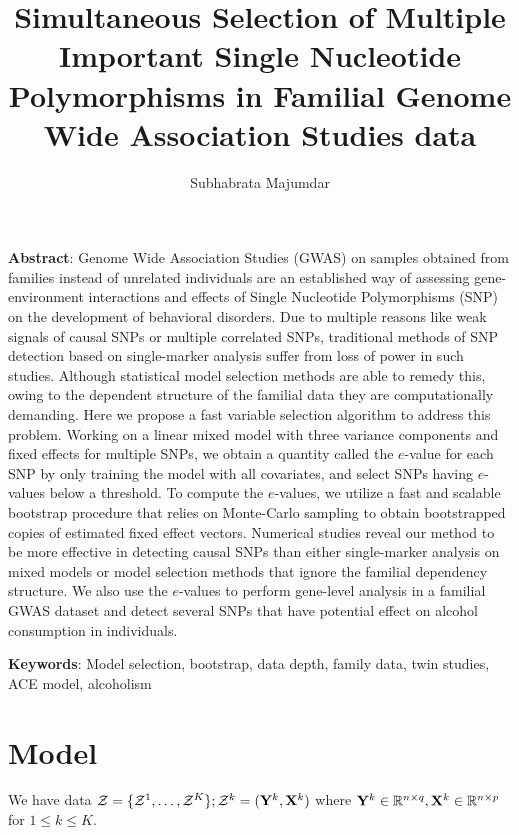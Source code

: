 \documentclass[fleqn,11pt]{article}
\numberwithin{equation}{section}
\begin{document}
\newtheorem{Theorem}{Theorem}[section]
\newtheorem{Lemma}[Theorem]{Lemma}
\newtheorem{Corollary}[Theorem]{Corollary}
\newtheorem{Proposition}[Theorem]{Proposition}
\newtheorem{Conjecture}[Theorem]{Conjecture}
\theoremstyle{definition} \newtheorem{Definition}[Theorem]{Definition}

\title{Simultaneous Selection of Multiple Important Single Nucleotide Polymorphisms in Familial Genome Wide Association Studies data}
\date{}
\author{Subhabrata Majumdar}
\maketitle

\noindent\textbf{Abstract}: Genome Wide Association Studies (GWAS) on samples obtained from families instead of unrelated individuals are an established way of assessing gene-environment interactions and effects of Single Nucleotide Polymorphisms (SNP) on the development of behavioral disorders. Due to multiple reasons like weak signals of causal SNPs or multiple correlated SNPs, traditional methods of SNP detection based on single-marker analysis suffer from loss of power in such studies. Although statistical model selection methods are able to remedy this, owing to the dependent structure of the familial data they are computationally demanding. Here we propose a fast variable selection algorithm to address this problem. Working on a linear mixed model with three variance components and fixed effects for multiple SNPs, we obtain a quantity called the $e$-value for each SNP by only training the model with all covariates, and select SNPs having $e$-values below a threshold. To compute the $e$-values, we utilize a fast and scalable bootstrap procedure that relies on Monte-Carlo sampling to obtain bootstrapped copies of estimated fixed effect vectors. Numerical studies reveal our method to be more effective in detecting causal SNPs than either single-marker analysis on mixed models or model selection methods that ignore the familial dependency structure. We also use the $e$-values to perform gene-level analysis in a familial GWAS dataset and detect several SNPs that have potential effect on alcohol consumption in individuals.
\vspace{.5cm}

\noindent\textbf{Keywords}: Model selection, bootstrap, data depth, family data, twin studies, ACE model, alcoholism

\newpage

\section{Model}
We have data ${\cal{Z}} = \{ {\cal{Z}}^1, \ldots, {\cal{Z}}^K \}; {\cal{Z}}^k = ({\mathbf{Y}}^k, {\mathbf{X}}^k)$ where ${\mathbf{Y}}^k \in {\mathbb{R}}^{n \times q}, {\mathbf{X}}^k \in {\mathbb{R}}^{n \times p}$ for $1 \leq k \leq K$.
\end{document}
